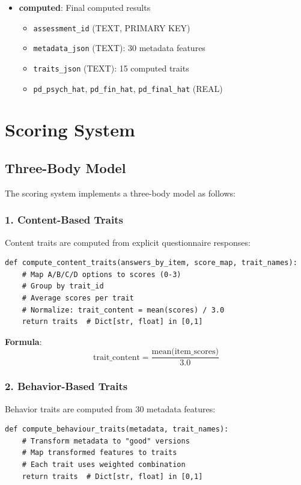 \documentclass[11pt,a4paper]{article}
\begin{document}
\begin{itemize}
    \item \textbf{computed}: Final computed results
        \begin{itemize}
            \item \texttt{assessment\_id} (TEXT, PRIMARY KEY)
            \item \texttt{metadata\_json} (TEXT): 30 metadata features
            \item \texttt{traits\_json} (TEXT): 15 computed traits
            \item \texttt{pd\_psych\_hat}, \texttt{pd\_fin\_hat}, \texttt{pd\_final\_hat} (REAL)
        \end{itemize}
\end{itemize}

\section{Scoring System}

\subsection{Three-Body Model}
The scoring system implements a three-body model as follows:

\subsubsection{1. Content-Based Traits}
Content traits are computed from explicit questionnaire responses:

\begin{lstlisting}[caption=Content Trait Computation]
def compute_content_traits(answers_by_item, score_map, trait_names):
    # Map A/B/C/D options to scores (0-3)
    # Group by trait_id
    # Average scores per trait
    # Normalize: trait_content = mean(scores) / 3.0
    return traits  # Dict[str, float] in [0,1]
\end{lstlisting}

\textbf{Formula}: 
\begin{equation}
\text{trait\_content} = \frac{\text{mean(item\_scores)}}{3.0}
\end{equation}

\subsubsection{2. Behavior-Based Traits}
Behavior traits are computed from 30 metadata features:

\begin{lstlisting}[caption=Behavior Trait Computation]
def compute_behaviour_traits(metadata, trait_names):
    # Transform metadata to "good" versions
    # Map transformed features to traits
    # Each trait uses weighted combination
    return traits  # Dict[str, float] in [0,1]
\end{lstlisting}
\end{document}
